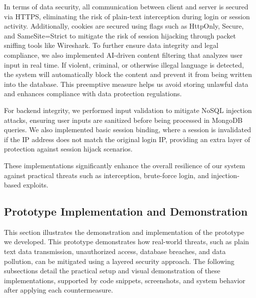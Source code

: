 \documentclass{article}
\begin{document}
In terms of data security, all communication between client and server is secured via HTTPS, eliminating the risk of plain-text interception during login or session activity. Additionally, cookies are secured using flags such as HttpOnly, Secure, and SameSite=Strict to mitigate the risk of session hijacking through packet sniffing tools like Wireshark. To further ensure data integrity and legal compliance, we also implemented AI-driven content filtering that analyzes user input in real time. If violent, criminal, or otherwise illegal language is detected, the system will automatically block the content and prevent it from being written into the database. This preemptive measure helps us avoid storing unlawful data and enhances compliance with data protection regulations.

For backend integrity, we performed input validation to mitigate NoSQL injection attacks, ensuring user inputs are sanitized before being processed in MongoDB queries. We also implemented basic session binding, where a session is invalidated if the IP address does not match the original login IP, providing an extra layer of protection against session hijack scenarios.

These implementations significantly enhance the overall resilience of our system against practical threats such as interception, brute-force login, and injection-based exploits.

\subsection{Prototype Implementation and Demonstration}
This section illustrates the demonstration and implementation of the prototype we developed. This prototype demonstrates how real-world threats, such as plain text data transmission, unauthorized access, database breaches, and data pollution, can be mitigated using a layered security approach. The following subsections detail the practical setup and visual demonstration of these implementations, supported by code snippets, screenshots, and system behavior after applying each countermeasure.
\end{document}
